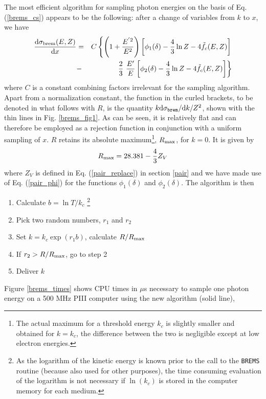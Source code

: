The most efficient algorithm for sampling photon energies on
the basis of Eq. (\ref{brems_cs}) appears to be the following:
after a change of variables from $k$ to $x$, we have
\begin{eqnarray}
{{\rm d} \sigma_{\rm brem}(E,Z) \over {\rm d} x} & = & C
\left\{ \left(1 + {E^{' 2} \over E^2} \right)
\left[ \phi_1(\delta) - \frac{4}{3} \ln Z - 4 \tilde{f}_c(E,Z) \right]
\right. \nonumber \\ & - & \left.
\frac{2}{3}~\frac{E'}{E} \left[\phi_2(\delta) -
\frac{4}{3} \ln Z - 4 \tilde{f}_c(E,Z) \right]
\right\}
\end{eqnarray}
where $C$ is a constant combining factors irrelevant for
the sampling algorithm. Apart from a normalization
constant, the function in the curled brackets, to be denoted
in what follows with $R$, is the
quantity $k {\rm d}\sigma_{\tt brem}/{\rm d}k/Z^2$, shown
with the thin lines in Fig. \ref{brems_fig1}. As can be seen,
it is relatively flat and can therefore be employed as a
rejection function in conjunction with a uniform sampling
of $x$. $R$ retains its absolute maximum\footnote{The actual maximum
for a threshold energy
$k_c$ is slightly smaller and obtained for $k=k_c$, the difference between the
two is negligible except at low electron energies.}, $R_{\rm max}$, for
$k = 0$. It is given by
\begin{equation}
R_{\rm max} = 28.381 - \frac{4}{3} Z_V
\end{equation}
where $Z_V$ is defined in Eq. (\ref{pair_replace}) in section \ref{pair}
and we have made use of Eq. (\ref{pair_phi}) for the functions
$\phi_1(\delta)$ and $\phi_2(\delta)$.
The algorithm is then
\begin{enumerate}
\item
Calculate $b = \ln T/k_c$ \footnote{As the logarithm of the kinetic
energy is known prior to the call to the {\tt BREMS} routine
(because also used for other purposes), the time consuming
evaluation of the logarithm is not necessary if $\ln(k_c)$ is
stored in the computer memory for each medium.}
\item
Pick two random numbers, $r_1$ and $r_2$
\item
Set $k = k_c \exp(r_1 b)$, calculate $R/R_{\rm max}$
\item
If $r_2 > R/R_{\rm max}$, go to step 2
\item
Deliver $k$
\end{enumerate}
Figure \ref{brems_times} shows CPU times in $\mu$s necessary to sample one
photon energy on a 500 MHz PIII computer
using the new algorithm (solid line),
